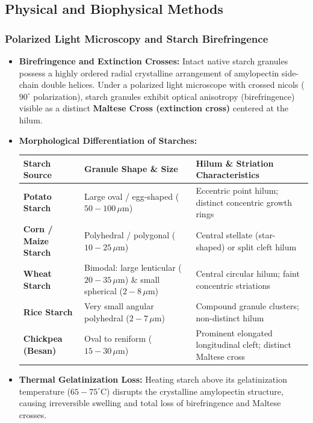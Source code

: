 \documentclass[11pt,a4paper,oneside]{article}
\begin{document}
\subsection{Physical and Biophysical Methods}

\subsubsection{Polarized Light Microscopy and Starch Birefringence}
\begin{itemize}[leftmargin=*]
    \item \textbf{Birefringence and Extinction Crosses:} Intact native starch granules possess a highly ordered radial crystalline arrangement of amylopectin side-chain double helices. Under a polarized light microscope with crossed nicols ($90^\circ$ polarization), starch granules exhibit optical anisotropy (birefringence) visible as a distinct \textbf{Maltese Cross (extinction cross)} centered at the hilum.
    \item \textbf{Morphological Differentiation of Starches:}
    \begin{center}
    \begin{tabular}{@{}p{2.8cm} p{4.2cm} p{8.4cm}@{}}
    \toprule
    \textbf{Starch Source} & \textbf{Granule Shape \& Size} & \textbf{Hilum \& Striation Characteristics} \tabularnewline
    \midrule
    \textbf{Potato Starch} & Large oval / egg-shaped ($50-100\,\mu\text{m}$) & Eccentric point hilum; distinct concentric growth rings \tabularnewline
    \textbf{Corn / Maize Starch} & Polyhedral / polygonal ($10-25\,\mu\text{m}$) & Central stellate (star-shaped) or split cleft hilum \tabularnewline
    \textbf{Wheat Starch} & Bimodal: large lenticular ($20-35\,\mu\text{m}$) \& small spherical ($2-8\,\mu\text{m}$) & Central circular hilum; faint concentric striations \tabularnewline
    \textbf{Rice Starch} & Very small angular polyhedral ($2-7\,\mu\text{m}$) & Compound granule clusters; non-distinct hilum \tabularnewline
    \textbf{Chickpea (Besan)} & Oval to reniform ($15-30\,\mu\text{m}$) & Prominent elongated longitudinal cleft; distinct Maltese cross \tabularnewline
    \bottomrule
    \end{tabular}
    \end{center}
    \item \textbf{Thermal Gelatinization Loss:} Heating starch above its gelatinization temperature ($65-75^\circ\text{C}$) disrupts the crystalline amylopectin structure, causing irreversible swelling and total loss of birefringence and Maltese crosses.
\end{itemize}
\end{document}
